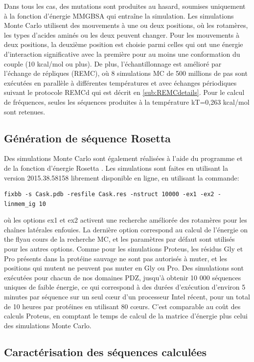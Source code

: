 Dans tous les cas, des mutations sont produites au hasard, soumises uniquement à la fonction d'énergie MMGBSA qui entraîne la simulation. Les simulations Monte Carlo utilisent des mouvements à une ou deux positions, où les rotamères, les types d'acides aminés ou les deux peuvent changer. Pour les mouvements à deux positions, la deuxième position est choisie parmi celles qui ont une énergie d'interaction significative avec la première pour au moins une conformation du couple (10 kcal/mol ou plus). De plus, l'échantillonnage est amélioré par l'échange de répliques (REMC), où $8$ simulations MC de 500 millions de pas sont exécutées en parallèle à différentes températures et avec échanges périodiques suivant le protocole REMCd qui est décrit en \ref{sub:REMCdetails}. Pour le calcul de fréquences, seules les séquences produites à la température kT=0,263 kcal/mol sont retenues. 

\subsection{Génération de séquence Rosetta}

Des simulations Monte Carlo sont également réalisées à l'aide du programme et de la fonction d'énergie Rosetta \cite{Baker06}. Les simulations sont faites en utilisant la version 2015.38.58158 librement disponible en ligne, en utilisant la commande:
\begin{verbatim}
fixbb -s Cask.pdb -resfile Cask.res -nstruct 10000 -ex1 -ex2 -linmem_ig 10
\end{verbatim} 
où les options ex1 et ex2 activent une recherche améliorée des rotamères pour les chaînes latérales enfouies. La dernière option correspond au calcul de l'énergie \og on the fly\fg au cours de la recherche MC, et les paramètres par défaut sont utilisés pour les autres options. Comme pour les simulations Proteus, les résidus Gly et Pro présents dans la protéine sauvage ne sont pas autorisés à muter, et les positions qui mutent ne peuvent pas muter en Gly ou Pro. Des simulations sont exécutées pour chacun de nos domaines PDZ, jusqu'à obtenir 10 000 séquences uniques de faible énergie, ce qui correspond à des durées d'exécution d'environ 5 minutes par séquence sur un seul cœur d'un processeur Intel récent, pour un total de 10 heures par protéines en utilisant 80 cœurs. C'est comparable au coût des calculs Proteus, en comptant le temps de calcul de la matrice d'énergie plus celui des simulations Monte Carlo.

\subsection{Caractérisation des séquences calculées}

